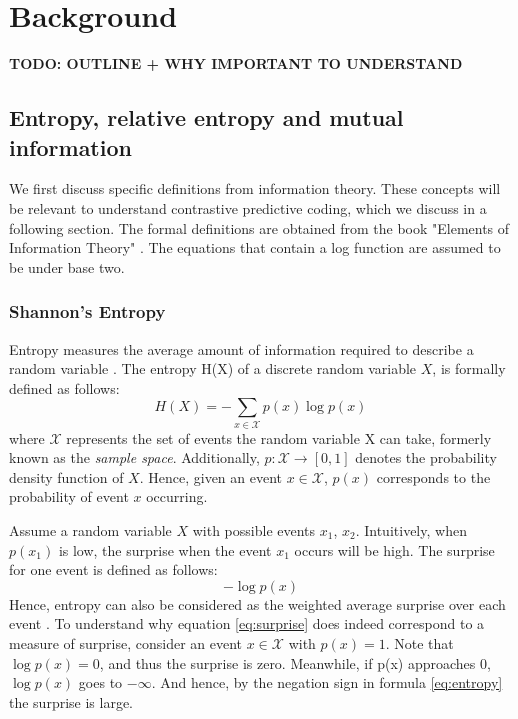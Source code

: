 
\chapter{Background}

\textbf{TODO: OUTLINE + WHY IMPORTANT TO UNDERSTAND}

\section{Entropy, relative entropy and mutual information}
We first discuss specific definitions from information theory. These concepts will be relevant to understand contrastive predictive coding, which we discuss in a following section. The formal definitions are obtained from the book "Elements of Information Theory" \cite{coverELEMENTSINFORMATIONTHEORY}. The equations that contain a log function are assumed to be under base two.
\subsection{Shannon's Entropy}
Entropy measures the average amount of information required to describe a random variable \cite{coverELEMENTSINFORMATIONTHEORY}. The entropy H(X) of a discrete random variable $X$, is formally defined as follows: 
\begin{equation}
	H(X) = -\sum_{x\in\mathcal{X}} p(x) \log p(x)  \label{eq:entropy}
\end{equation}
where $\mathcal{X}$ represents the set of events the random variable X can take, formerly known as the \textit{sample space}. Additionally, $p: \mathcal{X} \rightarrow [0, 1]$ denotes the probability density function of $X$. Hence, given an event $ x \in \mathcal{X}$, $p(x)$ corresponds to the probability of event $x$ occurring.

Assume a random variable $X$ with possible events $x_1$, $x_2$. Intuitively, when $p(x_1)$ is low, the surprise when the event $x_1$ occurs will be high. The surprise for one event is defined as follows:
\begin{equation}
	- \log p(x) \label{eq:surprise}
\end{equation}
Hence, entropy can also be considered as the weighted average surprise over each event \cite{datasciencecoursesAliGhodsiLec2017}. 
To understand why equation \ref{eq:surprise} does indeed correspond to a measure of surprise, consider an event $x \in \mathcal{X}$ with $p(x) = 1$. Note that $\log p(x) = 0$, and thus the surprise is zero. Meanwhile, if p(x) approaches $0$, $\log p(x)$ goes to $- \infty$. And hence, by the negation sign in formula \ref{eq:entropy} the surprise is large.


